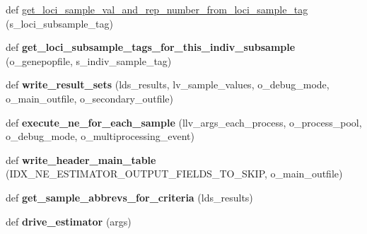 \begin{DoxyCompactItemize}
\item 
def \hyperlink{namespacenegui_1_1pgdriveneestimator_ac6e046ac333dcd975329026d752ea2d9}{get\+\_\+loci\+\_\+sample\+\_\+val\+\_\+and\+\_\+rep\+\_\+number\+\_\+from\+\_\+loci\+\_\+sample\+\_\+tag} (s\+\_\+loci\+\_\+subsample\+\_\+tag)
\item 
def {\bfseries get\+\_\+loci\+\_\+subsample\+\_\+tags\+\_\+for\+\_\+this\+\_\+indiv\+\_\+subsample} (o\+\_\+genepopfile, s\+\_\+indiv\+\_\+sample\+\_\+tag)\hypertarget{namespacenegui_1_1pgdriveneestimator_a3ad4e94d91a0c1c1757084b9cfe6f3af}{}\label{namespacenegui_1_1pgdriveneestimator_a3ad4e94d91a0c1c1757084b9cfe6f3af}

\item 
def {\bfseries write\+\_\+result\+\_\+sets} (lds\+\_\+results, lv\+\_\+sample\+\_\+values, o\+\_\+debug\+\_\+mode, o\+\_\+main\+\_\+outfile, o\+\_\+secondary\+\_\+outfile)\hypertarget{namespacenegui_1_1pgdriveneestimator_a9664c63b7ac063e43774e89e7c9674c2}{}\label{namespacenegui_1_1pgdriveneestimator_a9664c63b7ac063e43774e89e7c9674c2}

\item 
def {\bfseries execute\+\_\+ne\+\_\+for\+\_\+each\+\_\+sample} (llv\+\_\+args\+\_\+each\+\_\+process, o\+\_\+process\+\_\+pool, o\+\_\+debug\+\_\+mode, o\+\_\+multiprocessing\+\_\+event)\hypertarget{namespacenegui_1_1pgdriveneestimator_ad09b9b97dd438ce3e0f4fcf0206e6b22}{}\label{namespacenegui_1_1pgdriveneestimator_ad09b9b97dd438ce3e0f4fcf0206e6b22}

\item 
def {\bfseries write\+\_\+header\+\_\+main\+\_\+table} (I\+D\+X\+\_\+\+N\+E\+\_\+\+E\+S\+T\+I\+M\+A\+T\+O\+R\+\_\+\+O\+U\+T\+P\+U\+T\+\_\+\+F\+I\+E\+L\+D\+S\+\_\+\+T\+O\+\_\+\+S\+K\+IP, o\+\_\+main\+\_\+outfile)\hypertarget{namespacenegui_1_1pgdriveneestimator_a547e55a4d06bc1d5edf1b9d254dd34ca}{}\label{namespacenegui_1_1pgdriveneestimator_a547e55a4d06bc1d5edf1b9d254dd34ca}

\item 
def {\bfseries get\+\_\+sample\+\_\+abbrevs\+\_\+for\+\_\+criteria} (lds\+\_\+results)\hypertarget{namespacenegui_1_1pgdriveneestimator_a0b7ada08342688dc19f3be50db30ad0b}{}\label{namespacenegui_1_1pgdriveneestimator_a0b7ada08342688dc19f3be50db30ad0b}

\item 
def {\bfseries drive\+\_\+estimator} (args)\hypertarget{namespacenegui_1_1pgdriveneestimator_a75b4a299d8030d8bbca11e01fd3211da}{}\label{namespacenegui_1_1pgdriveneestimator_a75b4a299d8030d8bbca11e01fd3211da}


\end{DoxyCompactItemize}
